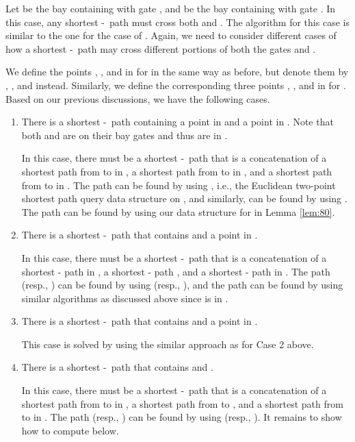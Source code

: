 \documentclass[english,runningheads,11pt]{llncs}
\def\st{-}
\begin{document}
Let  be the bay containing  with gate , and
 be the bay containing  with gate .
In this case, any shortest \st\ path must cross both  and . The
algorithm for this case is similar to the one for the case of . Again, we need to
consider different cases of how a shortest \st\ path may cross
different portions of both the gates  and .

We define the points , , and  in  for  in the
same way as
before, but denote them by , , and  instead.
Similarly, we define the corresponding three points ,
, and  in  for . Based on our previous
discussions, we have the following cases.

\begin{enumerate}
\item
There is a shortest \st\ path containing a point  in
 and a point  in .
Note that both  and  are on their bay gates and thus are in .

In this case, there must be a shortest \st\ path that is a
concatenation of a shortest path  from  to  in
, a shortest path  from  to  in ,
and a shortest path  from  to  in . The path
 can be found by using , i.e., the Euclidean
two-point shortest path query data structure on 
\cite{ref:GuibasOp89}, and similarly,  can be found by
using . The path  can be found by using our data
structure for  in Lemma \ref{lem:80}.

\item
There is a shortest \st\ path that contains 
and a point  in .

In this case, there must be a shortest \st\ path that is a
concatenation of a shortest - path  in
, a shortest - path , and a shortest - path
 in .
The path  (resp., ) can be found by using 
(resp., ), and the path
 can be found by using similar algorithms
as discussed above since  is in .

\item
There is a shortest \st\ path that contains 
and a point  in .

This case is solved by using the similar approach as for Case 2 above.

\item
There is a shortest \st\ path that contains  and .

In this case, there must be a shortest \st\ path that is a concatenation of a shortest path
 from  to  in
, a shortest path  from  to ,
and a shortest path  from  to  in .
The path  (resp., ) can be found by using 
(resp., ).  It remains to show how to compute  below.
\end{enumerate}
\end{document}
